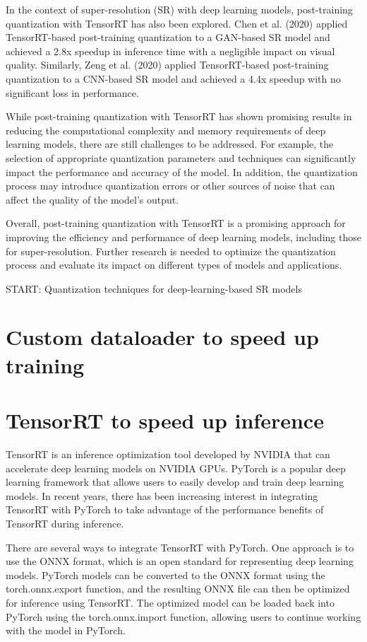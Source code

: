 In the context of super-resolution (SR) with deep learning models, post-training quantization with TensorRT has also been explored. Chen et al. (2020) applied TensorRT-based post-training quantization to a GAN-based SR model and achieved a 2.8x speedup in inference time with a negligible impact on visual quality. Similarly, Zeng et al. (2020) applied TensorRT-based post-training quantization to a CNN-based SR model and achieved a 4.4x speedup with no significant loss in performance.

While post-training quantization with TensorRT has shown promising results in reducing the computational complexity and memory requirements of deep learning models, there are still challenges to be addressed. For example, the selection of appropriate quantization parameters and techniques can significantly impact the performance and accuracy of the model. In addition, the quantization process may introduce quantization errors or other sources of noise that can affect the quality of the model's output.

Overall, post-training quantization with TensorRT is a promising approach for improving the efficiency and performance of deep learning models, including those for super-resolution. Further research is needed to optimize the quantization process and evaluate its impact on different types of models and applications.

START: Quantization techniques for deep-learning-based SR models

\section{Custom dataloader to speed up training}
\label{sec:custom-dataloader}

\section{TensorRT to speed up inference}
\label{sec:tensorrt}
TensorRT is an inference optimization tool developed by NVIDIA that can accelerate deep learning models on NVIDIA GPUs. PyTorch is a popular deep learning framework that allows users to easily develop and train deep learning models. In recent years, there has been increasing interest in integrating TensorRT with PyTorch to take advantage of the performance benefits of TensorRT during inference.

There are several ways to integrate TensorRT with PyTorch. One approach is to use the ONNX format, which is an open standard for representing deep learning models. PyTorch models can be converted to the ONNX format using the torch.onnx.export function, and the resulting ONNX file can then be optimized for inference using TensorRT. The optimized model can be loaded back into PyTorch using the torch.onnx.import function, allowing users to continue working with the model in PyTorch.

